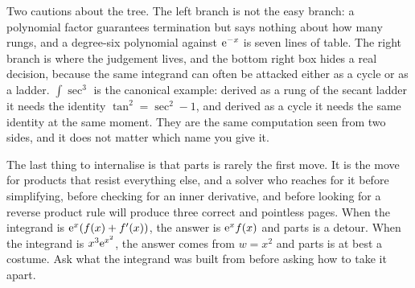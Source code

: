 \begin{center}
\end{center}

Two cautions about the tree. The left branch is not the easy branch: a polynomial factor guarantees termination but says nothing about how many rungs, and a degree-six polynomial against $\mathrm{e}^{-x}$ is seven lines of table. The right branch is where the judgement lives, and the bottom right box hides a real decision, because the same integrand can often be attacked either as a cycle or as a ladder. $\int\sec^{3}$ is the canonical example: derived as a rung of the secant ladder it needs the identity $\tan^{2}=\sec^{2}-1$, and derived as a cycle it needs the same identity at the same moment. They are the same computation seen from two sides, and it does not matter which name you give it.

The last thing to internalise is that parts is rarely the first move. It is the move for products that resist everything else, and a solver who reaches for it before simplifying, before checking for an inner derivative, and before looking for a reverse product rule will produce three correct and pointless pages. When the integrand is $\mathrm{e}^{x}(f(x)+f'(x))$, the answer is $\mathrm{e}^{x}f(x)$ and parts is a detour. When the integrand is $x^{3}\mathrm{e}^{x^{2}}$, the answer comes from $w=x^{2}$ and parts is at best a costume. Ask what the integrand was built from before asking how to take it apart.

